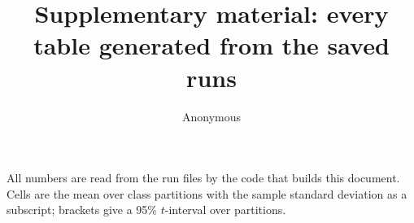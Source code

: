 \documentclass[10pt,twocolumn,letterpaper]{article}
\title{Supplementary material: every table generated from the saved runs}
\author{Anonymous}
\begin{document}
\maketitle
\noindent All numbers are read from the run files by the code that builds this document. Cells are the mean over class
partitions with the sample standard deviation as a subscript; brackets give a 95\% $t$-interval over partitions.

\begin{table}[t]\centering\small\setlength{\tabcolsep}{4pt}

\caption{All eight scores at 30\% of the parameters, schedules P and PMP.}
\end{table}
\begin{table}[t]\centering\small\setlength{\tabcolsep}{4pt}

\caption{Paired differences between choices, in points.}
\end{table}
\begin{table}[t]\centering\footnotesize\setlength{\tabcolsep}{3pt}

\caption{1-, 5- and 10-shot accuracy (\%) of the main models on the three novel-class sets.}
\end{table}
\begin{table}[t]\centering\footnotesize\setlength{\tabcolsep}{3pt}

\caption{Schedules for DACIS at 30\% of the parameters, 5-shot accuracy.}
\end{table}
\begin{table}[t]\centering\footnotesize\setlength{\tabcolsep}{3pt}

\caption{5-shot accuracy of four scores at four budgets (schedule PMP), one block per test setting.}
\end{table}
\begin{table}[t]\centering\footnotesize\setlength{\tabcolsep}{3pt}

\caption{Recovery length after pruning (PlantVillage).}
\end{table}
\begin{table}[t]\centering\footnotesize\setlength{\tabcolsep}{3pt}

\caption{DACIS components and design choices (PlantVillage).}
\end{table}
\begin{table}[t]\centering\footnotesize\setlength{\tabcolsep}{3pt}

\caption{Weights of DACIS on validation and novel classes (PlantVillage).}
\end{table}
\begin{table}[t]\centering\footnotesize\setlength{\tabcolsep}{3pt}

\caption{Learning rate of the episodic stage, 1- and 5-shot accuracy on the validation classes of the first partition. The PlantVillage column chose the value used everywhere; the RESISC45 sweep is a check.}
\end{table}
\end{document}
